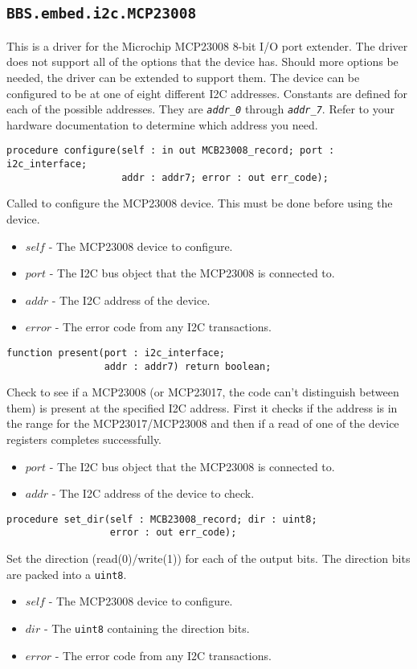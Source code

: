\documentclass[10pt, openany]{book}
\newcommand{\indexfunc}[1]{\index[func]{#1}}
\newcommand{\package}[1]{\texttt{#1}}
\newcommand{\constant}[1]{\emph{\texttt{#1}}}
\newcommand{\datatype}[1]{\texttt{#1}}
\begin{document}
\subsection{\package{BBS.embed.i2c.MCP23008}}
This is a driver for the Microchip MCP23008 8-bit I/O port extender\cite{MCP23008}.  The driver does not support all of the options that the device has.  Should more options be needed, the driver can be extended to support them.  The device can be configured to be at one of eight different I2C addresses.  Constants are defined for each of the possible addresses.  They are \constant{addr\_0} through \constant{addr\_7}.  Refer to your hardware documentation to determine which address you need.

\begin{lstlisting}
procedure configure(self : in out MCB23008_record; port : i2c_interface;
                    addr : addr7; error : out err_code);
\end{lstlisting}
\indexfunc{configure}
Called to configure the MCP23008 device.  This must be done before using the device.
\begin{itemize}
  \item $self$ - The MCP23008 device to configure.
  \item $port$ - The I2C bus object that the MCP23008 is connected to.
  \item $addr$ - The I2C address of the device.
  \item $error$ - The error code from any I2C transactions.
\end{itemize}

\begin{lstlisting}
function present(port : i2c_interface;
                 addr : addr7) return boolean;
\end{lstlisting}
\indexfunc{present}
Check to see if a MCP23008 (or MCP23017, the code can't distinguish between them) is present at the specified I2C address.  First it checks if the address is in the range for the MCP23017/MCP23008 and then if a read of one of the device registers completes successfully.
\begin{itemize}
  \item $port$ - The I2C bus object that the MCP23008 is connected to.
  \item $addr$ - The I2C address of the device to check.
\end{itemize}

\begin{lstlisting}
procedure set_dir(self : MCB23008_record; dir : uint8;
                  error : out err_code);
\end{lstlisting}
\indexfunc{set\_dir}
Set the direction (read(0)/write(1)) for each of the output bits.  The direction bits are packed into a \datatype{uint8}.
\begin{itemize}
  \item $self$ - The MCP23008 device to configure.
  \item $dir$ - The \datatype{uint8} containing the direction bits.
  \item $error$ - The error code from any I2C transactions.
\end{itemize}
\end{document}
